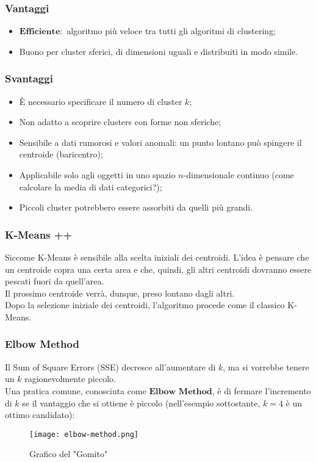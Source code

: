 		\subsubsection{Vantaggi}
			\begin{itemize}
				\item $\textbf{Efficiente}:$ algoritmo più veloce tra tutti gli algoritmi di clustering;
				\item Buono per cluster sferici, di dimensioni uguali e distribuiti in modo simile.
			\end{itemize}

		\subsubsection{Svantaggi}
			\begin{itemize}
				\item È necessario specificare il numero di cluster $k$;
				\item Non adatto a scoprire clusters con forme non sferiche;
				\item Sensibile a dati rumorosi e valori anomali: un punto lontano può spingere il centroide (baricentro);
				\item Applicabile solo agli oggetti in uno spazio $n$-dimensionale continuo (come calcolare la media di dati categorici?);
				\item Piccoli cluster potrebbero essere assorbiti da quelli più grandi.
			\end{itemize}

		\subsubsection{K-Means ++}
			Siccome K-Means è sensibile alla scelta iniziali dei centroidi.
			L'idea è pensare che un centroide copra una certa area e che, quindi, gli altri centroidi dovranno essere pescati fuori da quell'area.
			\\
			Il prossimo centroide verrà, dunque, preso lontano dagli altri.
			\\
			Dopo la selezione iniziale dei centroidi, l'algoritmo procede come il classico K-Means.

		\subsubsection{Elbow Method}
			Il Sum of Square Errors (SSE) decresce all'aumentare di $k$, ma si vorrebbe tenere un $k$ ragionevolmente piccolo.
			\\[1\baselineskip]
			Una pratica comune, conosciuta come $\textbf{Elbow Method}$, è di fermare l'incremento di $k$ se il vantaggio che si ottiene è piccolo
			(nell'esempio sottostante, $k = 4$ è un ottimo candidato):

			\begin{figure}[h]
				\caption[short]{Grafico del "Gomito"}
				\centering
				\texttt{[image: elbow-method.png]}
			\end{figure}

\clearpage